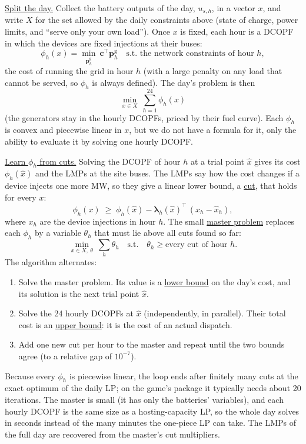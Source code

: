 \documentclass[10pt]{article}
\newcommand{\alert}[1]{{\color{alertblue}\uline{#1}}}
\begin{document}
\alert{Split the day.} Collect the battery outputs of the day, $u_{s,h}$, in a
vector $x$, and write $X$ for the set allowed by the daily constraints above
(state of charge, power limits, and ``serve only your own load''). Once $x$ is
fixed, each hour is a DCOPF in which the devices are fixed injections
at their buses:
\[
  \phi_h(x) = \min_{\mathbf p^{\mathrm g}_h}\ \mathbf c^{\top}\mathbf p^{\mathrm g}_h
  \quad\text{s.t. the network constraints of hour } h,
\]
the cost of running the grid in hour $h$ (with a large penalty on any load that
cannot be served, so $\phi_h$ is always defined). The day's problem is then
\[
  \min_{x \in X}\ \sum_{h=1}^{24} \phi_h(x)
\]
(the generators stay in the hourly DCOPFs, priced by their fuel curve).
Each $\phi_h$ is convex and piecewise linear in $x$, but we do not have a
formula for it, only the ability to evaluate it by solving one hourly DCOPF.

\alert{Learn $\phi_h$ from cuts.} Solving the DCOPF of hour $h$ at a trial
point $\hat x$ gives its cost $\phi_h(\hat x)$ and the LMPs at the site buses.
The LMPs say how the cost changes if a device injects one more MW, so they give
a linear lower bound, a \alert{cut}, that holds for every $x$:
\[
  \phi_h(x) \;\ge\; \phi_h(\hat x) - \boldsymbol\lambda_h(\hat x)^{\top}\,(x_h - \hat x_h),
\]
where $x_h$ are the device injections in hour $h$. The small \alert{master
problem} replaces each $\phi_h$ by a variable $\theta_h$ that must lie above all
cuts found so far:
\[
  \min_{x \in X,\ \theta}\ \sum_h \theta_h
  \quad\text{s.t.}\quad \theta_h \ge \text{every cut of hour } h .
\]
The algorithm alternates:
\begin{enumerate}[leftmargin=*]
  \item Solve the master problem. Its value is a \alert{lower bound} on the
    day's cost, and its solution is the next trial point $\hat x$.
  \item Solve the 24 hourly DCOPFs at $\hat x$ (independently, in parallel).
    Their total cost is an \alert{upper bound}: it is the cost of an actual
    dispatch.
  \item Add one new cut per hour to the master and repeat until the two bounds
    agree (to a relative gap of $10^{-7}$).
\end{enumerate}
Because every $\phi_h$ is piecewise linear, the loop ends after finitely many
cuts at the exact optimum of the daily LP; on the game's package it typically
needs about 20 iterations. The master is small (it has only the batteries'
variables), and each hourly DCOPF is the same size as a hosting-capacity LP, so
the whole day solves in seconds instead of the many minutes the one-piece LP can
take. The LMPs of the full day are recovered from the master's cut multipliers.
\end{document}
